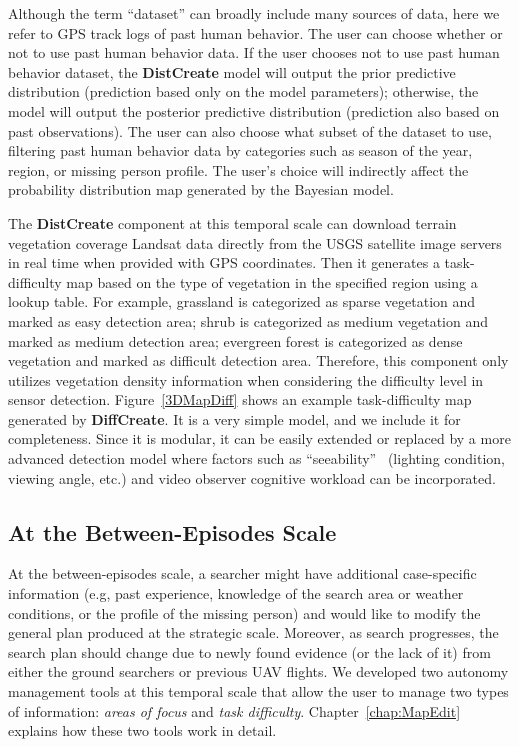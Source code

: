 Although the term ``dataset'' can broadly include many sources of data, here we refer to GPS track logs of past human behavior. The user can choose whether or not to use past human behavior data. If the user chooses not to use past human behavior dataset, the \textbf{DistCreate} model will output the prior predictive distribution (prediction based only on the model parameters); otherwise, the model will output the posterior predictive distribution (prediction also based on past observations). The user can also choose what subset of the dataset to use, filtering past human behavior data by categories such as season of the year, region, or missing person profile. The user's choice will indirectly affect the probability distribution map generated by the Bayesian model.

The \textbf{DistCreate} component at this temporal scale can download terrain vegetation coverage Landsat data directly from the USGS satellite image servers in real time when provided with GPS coordinates. Then it generates a task-difficulty map based on the type of vegetation in the specified region using a lookup table. For example, grassland is categorized as sparse vegetation and marked as easy detection area; shrub is categorized as medium vegetation and marked as medium detection area; evergreen forest is categorized as dense vegetation and marked as difficult detection area. Therefore, this component only utilizes vegetation density information when considering the difficulty level in sensor detection. Figure~\ref{3DMapDiff} shows an example task-difficulty map generated by \textbf{DiffCreate}. It is a very simple model, and we include it for completeness. Since it is modular, it can be easily extended or replaced by a more advanced detection model where factors such as ``seeability''~\cite{Morse2010UAV} (lighting condition, viewing angle, etc.) and video observer cognitive workload can be incorporated.

\subsection{At the Between-Episodes Scale}

At the between-episodes scale, a searcher might have additional case-specific information (e.g, past experience, knowledge of the search area or weather conditions, or the profile of the missing person) and would like to modify the general plan produced at the strategic scale. Moreover, as search progresses, the search plan should change due to newly found evidence (or the lack of it) from either the ground searchers or previous UAV flights. We developed two autonomy management tools at this temporal scale that allow the user to manage two types of information: \textit{areas of focus} and \textit{task difficulty}. Chapter~\ref{chap:MapEdit} explains how these two tools work in detail.

